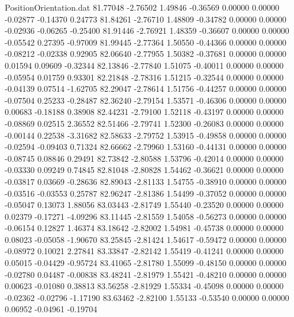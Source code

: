 \begin{filecontents}{PositionOrientation.dat}
  81.77048   -2.76502    1.49846    -0.36569    0.00000    0.00000   -0.02877   -0.14370    0.24773
  81.84261   -2.76710    1.48809    -0.34782    0.00000    0.00000   -0.02936   -0.06265   -0.25400
  81.91446   -2.76921    1.48359    -0.36607    0.00000    0.00000   -0.05542    0.27395   -0.97009
  81.99445   -2.77364    1.50550    -0.44366    0.00000    0.00000   -0.08212   -0.02338    0.92905
  82.06640   -2.77955    1.50382    -0.37681    0.00000    0.00000    0.01594    0.09609   -0.32344
  82.13846   -2.77840    1.51075    -0.40011    0.00000    0.00000   -0.05954    0.01759    0.93301
  82.21848   -2.78316    1.51215    -0.32544    0.00000    0.00000   -0.04139    0.07514   -1.62705
  82.29047   -2.78614    1.51756    -0.44257    0.00000    0.00000   -0.07504    0.25233   -0.28487
  82.36240   -2.79154    1.53571    -0.46306    0.00000    0.00000    0.00683   -0.18188    0.38908
  82.44231   -2.79100    1.52118    -0.43197    0.00000    0.00000   -0.08869    0.02515    2.36552
  82.51466   -2.79741    1.52300    -0.26083    0.00000    0.00000   -0.00144    0.22538   -3.31682
  82.58633   -2.79752    1.53915    -0.49858    0.00000    0.00000   -0.02594   -0.09403    0.71324
  82.66662   -2.79960    1.53160    -0.44131    0.00000    0.00000   -0.08745    0.08846    0.29491
  82.73842   -2.80588    1.53796    -0.42014    0.00000    0.00000   -0.03330    0.09249    0.74845
  82.81048   -2.80828    1.54462    -0.36621    0.00000    0.00000   -0.03817    0.03669   -0.28636
  82.89043   -2.81133    1.54755    -0.38910    0.00000    0.00000   -0.03516   -0.03553    0.25787
  82.96247   -2.81386    1.54499    -0.37052    0.00000    0.00000   -0.05047    0.13073    1.88056
  83.03443   -2.81749    1.55440    -0.23520    0.00000    0.00000    0.02379   -0.17271   -4.09296
  83.11445   -2.81559    1.54058    -0.56273    0.00000    0.00000   -0.06154    0.12827    1.46374
  83.18642   -2.82002    1.54981    -0.45738    0.00000    0.00000    0.08023   -0.05058   -1.90670
  83.25845   -2.81424    1.54617    -0.59472    0.00000    0.00000   -0.08972    0.10021    2.27841
  83.33847   -2.82142    1.55419    -0.41241    0.00000    0.00000    0.05015   -0.04429   -0.95724
  83.41065   -2.81780    1.55099    -0.48150    0.00000    0.00000   -0.02780    0.04487   -0.00838
  83.48241   -2.81979    1.55421    -0.48210    0.00000    0.00000    0.00623   -0.01080    0.38813
  83.56258   -2.81929    1.55334    -0.45098    0.00000    0.00000   -0.02362   -0.02796   -1.17190
  83.63462   -2.82100    1.55133    -0.53540    0.00000    0.00000    0.06952   -0.04961   -0.19704

\end{filecontents}
